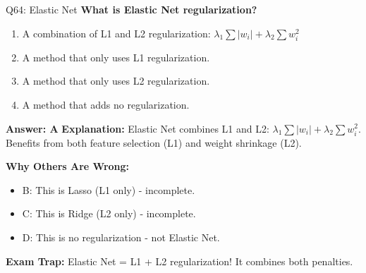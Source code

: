 \documentclass[8pt]{beamer}
\begin{document}
	\begin{frame}{Q64: Elastic Net}
		\fontsize{6.5}{7.5}\selectfont
		\textbf{What is Elastic Net regularization?}
		
		\begin{enumerate}
			\item A combination of L1 and L2 regularization: $\lambda_1 \sum |w_i| + \lambda_2 \sum w_i^2$
			\item A method that only uses L1 regularization.
			\item A method that only uses L2 regularization.
			\item A method that adds no regularization.
		\end{enumerate}
		
		\vspace{0.05cm}
		\textcolor{myblue}{\textbf{Answer: A}}
		\vspace{0.05cm}
		\textcolor{myblue}{\textbf{Explanation:}} Elastic Net combines L1 and L2: $\lambda_1 \sum |w_i| + \lambda_2 \sum w_i^2$. Benefits from both feature selection (L1) and weight shrinkage (L2).
		
		\vspace{0.05cm}
		\textcolor{myred}{\textbf{Why Others Are Wrong:}}
		\begin{itemize}
			\item \textcolor{myred}{B:} This is Lasso (L1 only) - incomplete.
			\item \textcolor{myred}{C:} This is Ridge (L2 only) - incomplete.
			\item \textcolor{myred}{D:} This is no regularization - not Elastic Net.
		\end{itemize}
		
		\textcolor{myred}{\textbf{Exam Trap:}} Elastic Net = \textcolor{myblue}{L1 + L2} regularization! It combines both penalties.
	\end{frame}
	
\end{document}
